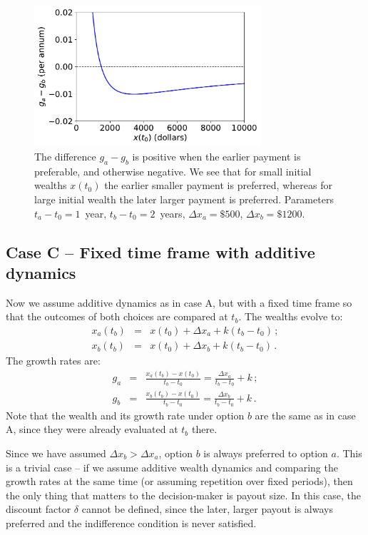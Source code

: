 \documentclass[11pt]{article}
\newcommand{\flabel}[1]{\label{fig:#1}}
\newcommand{\bea}{\begin{eqnarray}}
\newcommand{\eea}{\end{eqnarray}}
\newcommand{\Dx}{\Delta x}
\numberwithin{equation}{section}
\begin{document}
\begin{figure}[!htb]
\centering
\includegraphics[width=0.75\textwidth]{./figures/ga_gb.pdf}
\caption{The difference $g_a-g_b$ is positive when the earlier payment is preferable, and otherwise negative. We see that for small initial wealths $x(t_0)$ the earlier smaller payment is preferred, whereas for large initial wealth the later larger payment is preferred. Parameters $t_a-t_0=1$~year, $t_b-t_0=2$~years, $\Delta x_a=\$500$, $\Delta x_b=\$1200$.}
\flabel{reversal_2}
\end{figure}

\FloatBarrier
\subsection{Case C -- Fixed time frame with additive dynamics}\label{sec:case_C}

Now we assume additive dynamics as in case A, but with a fixed time frame so that the outcomes of both choices are compared at $t_b$. The wealths evolve to: \bea
x_a\left(t_b\right) &=& x\left(t_0\right) + \Dx_a + k(t_b-t_0)\,; \\
x_b\left(t_b\right) &=& x\left(t_0\right) + \Dx_b + k(t_b-t_0)\,.
\eea
The growth rates are:
\bea
g_a &=& \frac{x_a\left(t_b\right) - x\left(t_0\right)}{t_b-t_0} = \frac{\Dx_a}{t_b-t_0} + k\,;\\
g_b &=& \frac{x_b\left(t_b\right) - x\left(t_0\right)}{t_b-t_0} = \frac{\Dx_b}{t_b-t_0} + k\,.
\eea
Note that the wealth and its growth rate under option $b$ are the same as in case A, since they were already evaluated at $t_b$ there.

Since we have assumed $\Dx_b > \Dx_a$, option $b$ is always preferred to option $a$. This is a trivial case -- if we assume additive wealth dynamics and comparing the growth rates at the same time (or assuming repetition over fixed periods), then the only thing that matters to the decision-maker is payout size. In this case, the discount factor $\delta$ cannot be defined, since the later, larger payout is always preferred and the indifference condition is never satisfied.
\end{document}
